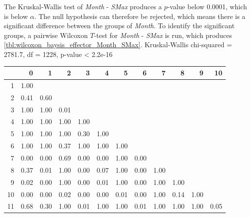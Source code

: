 The Kruskal-Wallis test of \textit{Month} - \textit{SMax} produces a $p$-value below 0.0001, which is below $\alpha$. The null hypothesis can therefore be rejected, which means there is a significant difference between the groups of \textit{Month}. To identify the significant groups, a pairwise Wilcoxon $T$-test for \textit{Month} - \textit{SMax} is run, which produces \cref{tbl:wilcoxon_baysis_effector_Month_SMax}. 
Kruskal-Wallis chi-squared = 2781.7, df = 1228, p-value < 2.2e-16
\begin{tabular}{rrrrrrrrrrrr}
  \hline
 & 0 & 1 & 2 & 3 & 4 & 5 & 6 & 7 & 8 & 9 & 10 \\ 
  \hline
1 & 1.00 &  &  &  &  &  &  &  &  &  &  \\ 
  2 & 0.41 & 0.60 &  &  &  &  &  &  &  &  &  \\ 
  3 & 1.00 & 1.00 & 0.01 &  &  &  &  &  &  &  &  \\ 
  4 & 1.00 & 1.00 & 1.00 & 1.00 &  &  &  &  &  &  &  \\ 
  5 & 1.00 & 1.00 & 1.00 & 0.30 & 1.00 &  &  &  &  &  &  \\ 
  6 & 1.00 & 1.00 & 0.37 & 1.00 & 1.00 & 1.00 &  &  &  &  &  \\ 
  7 & 0.00 & 0.00 & 0.69 & 0.00 & 0.00 & 1.00 & 0.00 &  &  &  &  \\ 
  8 & 0.37 & 0.01 & 1.00 & 0.00 & 0.07 & 1.00 & 0.00 & 1.00 &  &  &  \\ 
  9 & 0.02 & 0.00 & 1.00 & 0.00 & 0.01 & 1.00 & 0.00 & 1.00 & 1.00 &  &  \\ 
  10 & 0.00 & 0.00 & 0.02 & 0.00 & 0.00 & 0.01 & 0.00 & 1.00 & 0.14 & 1.00 &  \\ 
  11 & 0.68 & 0.30 & 1.00 & 0.01 & 1.00 & 1.00 & 0.01 & 1.00 & 1.00 & 1.00 & 0.05 \\ 
   \hline
\end{tabular}

